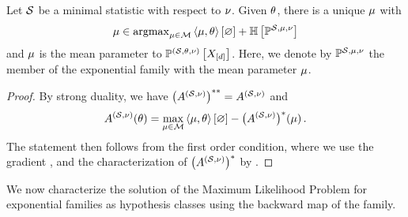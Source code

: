 \begin{theorem}
    Let $\mathcal{S}$ be a minimal statistic with respect to $\nu$.
    Given $\theta$, there is a unique $\mu$ with
    \begin{align*}
        \meanparam \in \argmax_{\meanparam\in\meanset} \contraction{\meanparam,\canparam} + \sentropyof{\expdistof{\sstat,\meanparam,\basemeasure}} %
    \end{align*}
    and $\mu$ is the mean parameter to $\mathbb{P}^{(\mathcal{S},\theta,\nu)}\left[X_{[d]}\right]$.
    Here, we denote by $\mathbb{P}^{\mathcal{S},\mu,\nu}$ the member of the exponential family with the mean parameter $\mu$.
\end{theorem}
\begin{proof}
    By strong duality, we have $\left(A^{(\mathcal{S},\nu)}\right)^{**}=A^{(\mathcal{S},\nu)}$ and
    \begin{align*}
        A^{(\mathcal{S},\nu)}(\theta) = \max_{\mu\in\mathcal{M}} \left\langle \mu,\theta\right\rangle \left[ \varnothing \right] -  \big(A^{(\mathcal{S},\nu)}\big)^*(\mu) \, .
    \end{align*}
    The statement then follows from the first order condition, where we use the gradient , and the characterization of $\big(A^{(\mathcal{S},\nu)}\big)^*$ by . %
\end{proof}


We now characterize the solution of the Maximum Likelihood Problem for exponential families as hypothesis classes using the backward map of the family.

